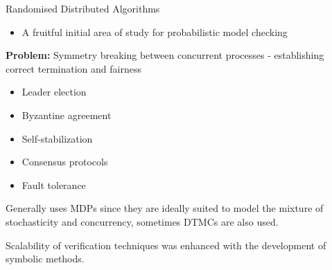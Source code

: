\documentclass[dvipsnames]{beamer}
\begin{document}
\begin{frame}{Randomised Distributed Algorithms}
    \begin{itemize}
        \item A fruitful initial area of study for probabilistic model checking
    \end{itemize}

    \textbf{Problem:} Symmetry breaking between concurrent
    processes - establishing correct termination and fairness


    \begin{itemize}
        \item Leader election
        \item Byzantine agreement
        \item Self-stabilization
        \item Consensus protocols
        \item Fault tolerance
    \end{itemize}
    Generally uses MDPs since they are ideally suited to model the mixture of stochasticity and concurrency,
    sometimes DTMCs are also used.

    Scalability of verification techniques was enhanced with the development of symbolic methods.


\end{frame}


\end{document}
